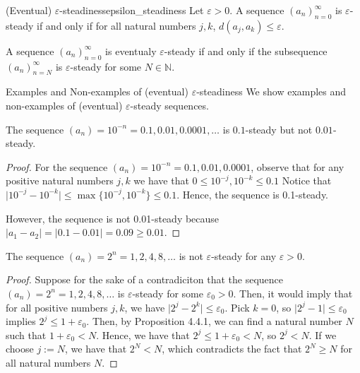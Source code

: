 \begin{definition}{(Eventual) $\varepsilon$-steadiness}{epsilon_steadiness}
    Let $\varepsilon > 0.$ 
    A sequence $(a_n )_{n=0}^\infty$ is $\varepsilon$-steady
    if and only if for all natural numbers $j, k$, $d(a_j, a_k) \leq \varepsilon$.

    A sequence $(a_n )_{n=0}^\infty$ is eventualy $\varepsilon$-steady 
    if and only if the subsequence $(a_n )_{n=N}^\infty$ is $\varepsilon$-steady for some $N \in \mathbb{N}.$
\end{definition}
\begin{problem}{Examples and Non-examples of (eventual) $\varepsilon$-steadiness}
    We show examples and non-examples of (eventual) $\varepsilon$-steady sequences.
\end{problem}
\begin{proposition}
    The sequence $(a_n ) = 10^{-n} = 0.1, 0.01, 0.0001, \dots$ is $0.1$-steady but not $0.01$-steady.
\end{proposition}
\begin{proof}
    For the sequence $(a_n) = 10^{-n} = 0.1, 0.01, 0.0001$, observe that for any positive natural numbers $j, k$ we have that $0 \leq 10^{-j}, 10^{-k} \leq 0.1$
    Notice that $\lvert 10^{-j} - 10^{-k} \rvert \leq \max \{10^{-j}, 10^{-k}\} \leq 0.1$. Hence, the sequence is 0.1-steady.

    However, the sequence is not 0.01-steady because $\lvert a_1 - a_2 \rvert = \lvert 0.1 - 0.01 \rvert = 0.09 \geq 0.01.$
\end{proof}
\begin{proposition}
    The sequence $(a_n ) = 2^n = 1, 2, 4, 8, \dots$ is not $\varepsilon$-steady for any $\varepsilon > 0$.
\end{proposition}
\begin{proof}
    Suppose for the sake of a contradiciton that the sequence $(a_n) = 2^n = 1, 2, 4, 8, \dots$ is $\varepsilon$-steady for some $\varepsilon _0 > 0$.
    Then, it would imply that for all positive numbers $j, k$, we have $\lvert 2^j - 2^k \rvert \leq \varepsilon _0.$
    Pick $k = 0$, so $\lvert 2^j - 1 \rvert \leq \varepsilon_0$ implies $2^j \leq 1 + \varepsilon_0$. Then, by Proposition 4.4.1, we can find a natural number $N$ such that $1 + \varepsilon_0 < N.$ 
    Hence, we have that $2^j \leq 1 + \varepsilon_0 < N$, so $2^j < N.$
    If we choose $j := N$, we have that $2^N < N$, which contradicts the fact that $2^N \geq N$ for all natural numbers $N$.
\end{proof}

